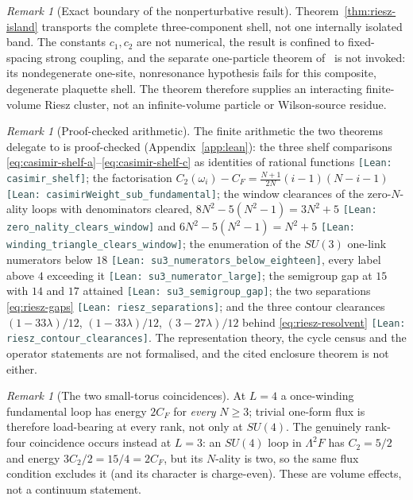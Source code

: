 \documentclass[11pt]{article}
\theoremstyle{plain}
\theoremstyle{definition}
\theoremstyle{remark}
\newtheorem{remark}[theorem]{Remark}
\newcommand{\chk}[1]{}
\newcommand{\leanref}[1]{{\footnotesize\textcolor{DarkSlateGray}{\texttt{[Lean: #1]}}}}
\newcommand{\CF}{C_F}
\begin{document}
\begin{remark}[Exact boundary of the nonperturbative result]
Theorem~\ref{thm:riesz-island} transports the complete three-component shell,
not one internally isolated band. The constants $c_1,c_2$ are not numerical,
the result is confined to fixed-spacing strong coupling, and the separate
one-particle theorem of~\cite{Yarotsky2004QP} is not invoked: its
nondegenerate one-site, nonresonance hypothesis fails for this composite,
degenerate plaquette shell. The theorem therefore supplies an interacting
finite-volume Riesz cluster, not an infinite-volume particle or Wilson-source
residue.
\end{remark}

\begin{remark}[Proof-checked arithmetic]
The finite arithmetic the two theorems delegate to is proof-checked
(Appendix~\ref{app:lean}): the three shelf comparisons
\eqref{eq:casimir-shelf-a}--\eqref{eq:casimir-shelf-c} as identities of
rational functions \leanref{casimir\_shelf}; the factorisation
$C_2(\omega_i)-\CF=\frac{N+1}{2N}(i-1)(N-i-1)$
\leanref{casimirWeight\_sub\_fundamental}; the window clearances of the
zero-$N$-ality loops with denominators cleared,
$8N^2-5(N^2-1)=3N^2+5$ \leanref{zero\_nality\_clears\_window} and
$6N^2-5(N^2-1)=N^2+5$ \leanref{winding\_triangle\_clears\_window}; the
enumeration of the $SU(3)$ one-link numerators below $18$
\leanref{su3\_numerators\_below\_eighteen}, every label above $4$ exceeding
it \leanref{su3\_numerator\_large}; the semigroup
gap at $15$ with $14$ and $17$ attained \leanref{su3\_semigroup\_gap}; the two
separations \eqref{eq:riesz-gaps} \leanref{riesz\_separations}; and the three
contour clearances $(1-33\lambda)/12$, $(1-33\lambda)/12$, $(3-27\lambda)/12$
behind \eqref{eq:riesz-resolvent} \leanref{riesz\_contour\_clearances}. The
representation theory, the cycle census and the operator statements are not
formalised, and the cited enclosure theorem is not either.
\end{remark}
\chk{the retained electric shell is exactly the trivial-flux charge-odd plaquette span}
\chk{below 5 C_F/2 the trivial-flux electric spectrum is exactly 0 and 2 C_F}

\begin{remark}[The two small-torus coincidences]
At $L=4$ a once-winding fundamental loop has energy $2\CF$ for
\emph{every} $N\ge3$; trivial one-form flux is therefore load-bearing at
every rank, not only at $SU(4)$. The genuinely rank-four coincidence occurs
instead at $L=3$: an $SU(4)$ loop in $\Lambda^2F$ has
$C_2=5/2$ and energy $3C_2/2=15/4=2\CF$, but its $N$-ality is two, so the
same flux condition excludes it (and its character is charge-even). These
are volume effects, not a continuum statement.
\end{remark}
\end{document}
